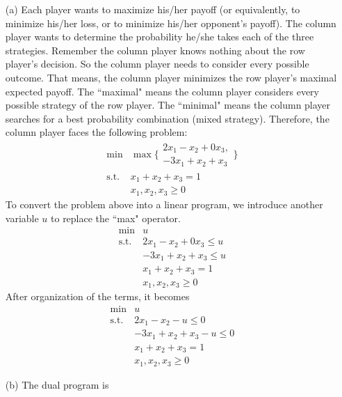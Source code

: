 \documentclass[12pt]{article}
\begin{document}
\begin{itemize}
	\item[(a)] Each player wants to maximize his/her payoff (or equivalently, to minimize his/her loss, or to minimize his/her opponent's payoff). The column player wants to determine the probability he/she takes each of the three strategies. Remember the column player knows nothing about the row player's decision. So the column player needs to consider every possible outcome. That means, the column player minimizes the row player's maximal expected payoff. The ``maximal" means the column player considers every possible strategy of the row player. The ``minimal" means the column player searches for a best probability combination (mixed strategy). Therefore, the column player faces the following problem:
	\begin{equation*}
	\begin{array}{rl}
	\min & \max \{\begin{array}{l}2x_1-x_2+0x_3,\\-3x_1+x_2+x_3 \end{array}\} \\
	\text{s.t.} & x_1+x_2+x_3 = 1 \\
	& x_1,x_2,x_3 \geq 0
	\end{array}
	\end{equation*}
	To convert the problem above into a linear program, we introduce another variable $u$ to replace the ``max" operator.
	\begin{equation*}
	\begin{array}{rl}
	\min & u \\
	\text{s.t.} & 2x_1-x_2+0x_3 \leq u \\
	& -3x_1+x_2+x_3 \leq u \\
	& x_1+x_2+x_3 = 1 \\
	& x_1,x_2,x_3 \geq 0
	\end{array}
	\end{equation*}
	After organization of the terms, it becomes
	\begin{equation*}
	\begin{array}{rl}
	\min & u \\
	\text{s.t.} & 2x_1-x_2 - u \leq 0 \\
	& -3x_1+x_2+x_3 - u \leq 0 \\
	& x_1+x_2+x_3 = 1 \\
	& x_1,x_2,x_3 \geq 0
	\end{array}
	\end{equation*}
	\item[(b)] The dual program is

\end{itemize}
\end{document}
